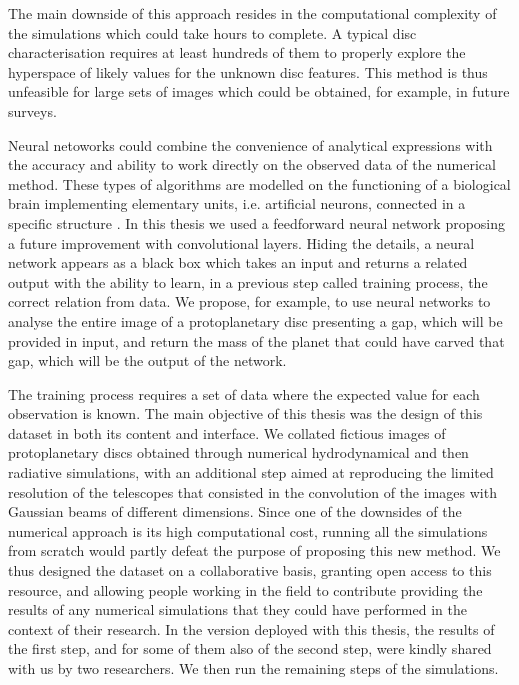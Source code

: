 \documentclass[a4paper,10pt, margin=1cm]{article}
\begin{document}
The main downside of this approach resides in the computational complexity of the simulations which 
could take hours to complete. A typical disc characterisation requires at least
hundreds of them to properly explore 
the hyperspace of likely values for the unknown disc features. This method is
thus unfeasible for large sets of images which could be obtained, for example, in future surveys.

Neural netoworks could combine the convenience of analytical expressions with the accuracy and ability to work directly on the observed data
of the numerical method. These types of algorithms are modelled on the functioning of a biological brain implementing 
elementary units, i.e. artificial neurons, connected in a specific structure \citep{ml4physics}. In this thesis we used a feedforward neural network 
proposing a future improvement with convolutional layers.
Hiding the details, a neural network appears as a black box which takes an input and returns a related output with the ability 
to learn, in a previous step called training process, the correct relation from data. We propose, for example, to use neural networks
to analyse the entire image of a protoplanetary disc presenting a gap, which will be provided in input, and return the mass of the 
planet that could have carved that gap, which will be the output of the network. 

The training process requires a set of data where the expected value for each observation is known.
The main objective of this thesis was the design of this dataset in both its content and interface.
We collated fictious images of protoplanetary discs
obtained through numerical hydrodynamical and then radiative simulations, with
an additional step aimed at reproducing the limited resolution of the telescopes that consisted in the convolution
of the images with
Gaussian beams of different dimensions.
Since one of the downsides of the numerical approach is its high computational cost, running all the simulations 
from scratch would partly defeat the purpose of proposing this new method. 
We thus designed the dataset on a collaborative basis, granting open access to this resource, and allowing people working in the field
to contribute providing the results of any numerical simulations that they could have performed in the context of their research.
In the version deployed with this thesis, the results of the first step, and for some of them 
also of the second step, were kindly shared with us 
by two researchers.
We then run the remaining steps of the simulations.
\end{document}
